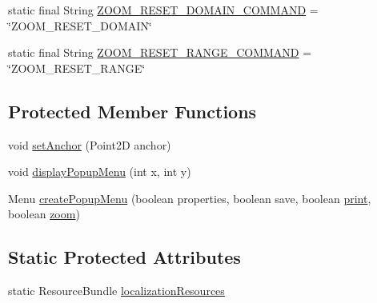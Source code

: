 \begin{DoxyCompactItemize}
\item 
static final String \mbox{\hyperlink{classorg_1_1jfree_1_1experimental_1_1chart_1_1swt_1_1_chart_composite_a11d26eac02278b50d03ba3fdc3b90ebc}{Z\+O\+O\+M\+\_\+\+R\+E\+S\+E\+T\+\_\+\+D\+O\+M\+A\+I\+N\+\_\+\+C\+O\+M\+M\+A\+ND}} = \char`\"{}Z\+O\+O\+M\+\_\+\+R\+E\+S\+E\+T\+\_\+\+D\+O\+M\+A\+IN\char`\"{}
\item 
static final String \mbox{\hyperlink{classorg_1_1jfree_1_1experimental_1_1chart_1_1swt_1_1_chart_composite_a8ac781e94a1439b0ef8cf2adf2ee2ad2}{Z\+O\+O\+M\+\_\+\+R\+E\+S\+E\+T\+\_\+\+R\+A\+N\+G\+E\+\_\+\+C\+O\+M\+M\+A\+ND}} = \char`\"{}Z\+O\+O\+M\+\_\+\+R\+E\+S\+E\+T\+\_\+\+R\+A\+N\+GE\char`\"{}
\end{DoxyCompactItemize}
\subsection*{Protected Member Functions}
\begin{DoxyCompactItemize}
\item 
void \mbox{\hyperlink{classorg_1_1jfree_1_1experimental_1_1chart_1_1swt_1_1_chart_composite_a622422afa70309c512e16b8ed52eb02a}{set\+Anchor}} (Point2D anchor)
\item 
void \mbox{\hyperlink{classorg_1_1jfree_1_1experimental_1_1chart_1_1swt_1_1_chart_composite_a801a0f3d1e4b55f07bac1d2081db65da}{display\+Popup\+Menu}} (int x, int y)
\item 
Menu \mbox{\hyperlink{classorg_1_1jfree_1_1experimental_1_1chart_1_1swt_1_1_chart_composite_ac73f8d9eb04c01f0a1ad6eac5d1e87f2}{create\+Popup\+Menu}} (boolean properties, boolean save, boolean \mbox{\hyperlink{classorg_1_1jfree_1_1experimental_1_1chart_1_1swt_1_1_chart_composite_a059b7aaa0b6cd3b9270e50e51966ec94}{print}}, boolean \mbox{\hyperlink{classorg_1_1jfree_1_1experimental_1_1chart_1_1swt_1_1_chart_composite_a333608aa2d2a3bc356c79c5bac9462ec}{zoom}})
\end{DoxyCompactItemize}
\subsection*{Static Protected Attributes}
\begin{DoxyCompactItemize}
\item 
static Resource\+Bundle \mbox{\hyperlink{classorg_1_1jfree_1_1experimental_1_1chart_1_1swt_1_1_chart_composite_a8b76b41daf910ec393fabcb7091d3003}{localization\+Resources}}
\end{DoxyCompactItemize}


